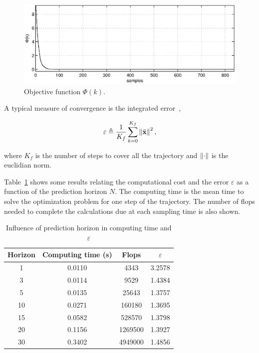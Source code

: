 \documentclass[conference]{IEEEtran} %
\begin{document}
\begin{figure}[htbp]
	\centering
    \includegraphics[width=.99\linewidth]{Figures/cost.eps}
    \caption{Objective function $\Phi(k)$.}
    \label{fig:cost}
\end{figure}

A typical measure of convergence is the integrated error~\cite{essen01},

\begin{equation*}
	\varepsilon \triangleq \frac{1}{K_f}\sum_{k=0}^{K_f}\left\|\tilde{\bf x}\right\|^2,
\end{equation*}

\noindent where $K_f$ is the number of steps to cover all the trajectory and
$\left\|{\bf\cdot}\right\|$ is the euclidian norm.

Table~\ref{table:table1} shows some results relating the computational cost
and the error $\varepsilon$ as a function of the prediction horizon $N$.
The computing time is the mean time to solve the optimization problem
for one step of the trajectory. The number of flops needed to complete the
calculations due at each sampling time is also shown.
 
\begin{table}[htpb]
 \caption{Influence of prediction horizon in computing time and $\varepsilon$}
 \label{table:table1}
 \centering
 \begin{tabular}{cccc}
  \hline
  Horizon & Computing time (s) & Flops & $\varepsilon$ \\
  \hline\hline
  1  & 0.0110 & 4343    & 3.2578  \\
  3  & 0.0114 & 9529    & 1.4384  \\
  5  & 0.0135 & 25643   & 1.3757  \\
  10 & 0.0271 & 160180  & 1.3695  \\
  15 & 0.0582 & 528570  & 1.3798  \\
  20 & 0.1156 & 1269500 & 1.3927  \\
  30 & 0.3402 & 4949000 & 1.4856  \\
  \hline
 \end{tabular}
\end{table}
 
\end{document}
